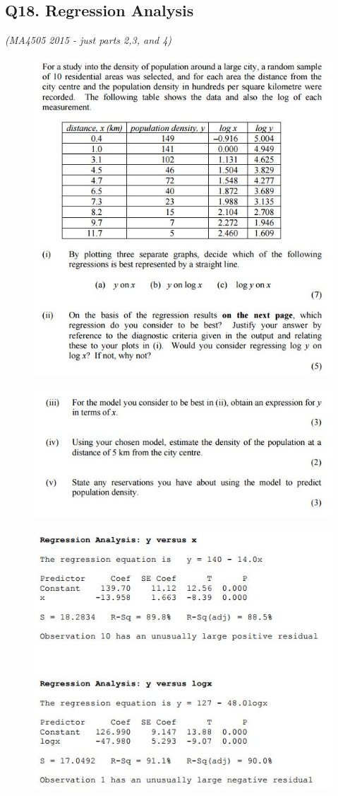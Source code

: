 \documentclass[a4paper,12pt]{article}
\begin{document}
\subsection*{Q18. Regression Analysis}
\textit{(MA4505  2015 - just parts 2,3, and 4)}
\begin{figure}[h!]
\centering
\includegraphics[width=0.8\linewidth]{images/ReviewQ18-a}
\end{figure}
\begin{figure}[h!]
	\centering
	\includegraphics[width=0.8\linewidth]{images/ReviewQ18-b}
\end{figure}
\newpage
\begin{figure}[h!]
	\centering
	\includegraphics[width=0.8\linewidth]{images/ReviewQ18-c}
\end{figure}
\end{document}
